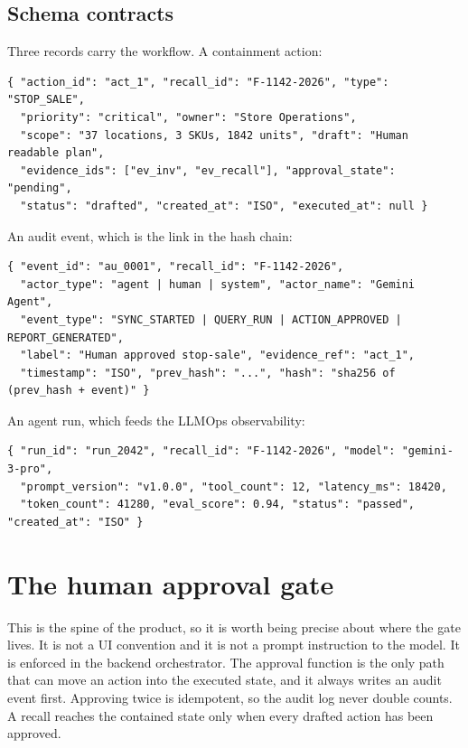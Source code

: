 \documentclass[11pt]{article}
\begin{document}
\subsection{Schema contracts}

Three records carry the workflow. A containment action:

\begin{lstlisting}[style=js,caption={containment\_actions record.}]
{ "action_id": "act_1", "recall_id": "F-1142-2026", "type": "STOP_SALE",
  "priority": "critical", "owner": "Store Operations",
  "scope": "37 locations, 3 SKUs, 1842 units", "draft": "Human readable plan",
  "evidence_ids": ["ev_inv", "ev_recall"], "approval_state": "pending",
  "status": "drafted", "created_at": "ISO", "executed_at": null }
\end{lstlisting}

An audit event, which is the link in the hash chain:

\begin{lstlisting}[style=js,caption={audit\_events record.}]
{ "event_id": "au_0001", "recall_id": "F-1142-2026",
  "actor_type": "agent | human | system", "actor_name": "Gemini Agent",
  "event_type": "SYNC_STARTED | QUERY_RUN | ACTION_APPROVED | REPORT_GENERATED",
  "label": "Human approved stop-sale", "evidence_ref": "act_1",
  "timestamp": "ISO", "prev_hash": "...", "hash": "sha256 of (prev_hash + event)" }
\end{lstlisting}

An agent run, which feeds the LLMOps observability:

\begin{lstlisting}[style=js,caption={agent\_runs record.}]
{ "run_id": "run_2042", "recall_id": "F-1142-2026", "model": "gemini-3-pro",
  "prompt_version": "v1.0.0", "tool_count": 12, "latency_ms": 18420,
  "token_count": 41280, "eval_score": 0.94, "status": "passed", "created_at": "ISO" }
\end{lstlisting}

\section{The human approval gate}

This is the spine of the product, so it is worth being precise about where the gate lives. It is
not a UI convention and it is not a prompt instruction to the model. It is enforced in the backend
orchestrator. The approval function is the only path that can move an action into the executed
state, and it always writes an audit event first. Approving twice is idempotent, so the audit log
never double counts. A recall reaches the contained state only when every drafted action has been
approved.
\end{document}
